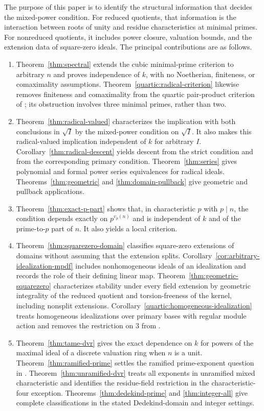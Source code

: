 \documentclass[11pt,a4paper]{amsart}
\theoremstyle{definition}
\theoremstyle{remark}
\numberwithin{equation}{section}
\begin{document}
The purpose of this paper is to identify the structural information that
decides the mixed-power condition. For reduced quotients, that information
is the interaction between roots of unity and residue characteristics at
minimal primes. For nonreduced quotients, it includes power closure,
valuation bounds, and the extension data of square-zero ideals. The
principal contributions are as follows.
\begin{enumerate}
\item Theorem~\ref{thm:spectral} extends the cubic minimal-prime criterion
to arbitrary $n$ and proves independence of $k$, with no Noetherian,
finiteness, or comaximality assumptions.
Theorem~\ref{quartic:radical-criterion} likewise removes finiteness
and comaximality from the quartic pair-product criterion of
\cite[Theorem~2.8]{TAHA}; its obstruction involves three minimal
primes, rather than two.
\item Theorem~\ref{thm:radical-valued} characterizes the implication with
both conclusions in $\sqrt I$ by the mixed-power condition on $\sqrt I$.
It also makes this radical-valued implication independent of $k$ for
arbitrary $I$. Corollary~\ref{thm:radical-descent} yields descent from
the strict condition and from the corresponding primary condition.
Theorem~\ref{thm:series} gives polynomial and formal power series
equivalences for radical ideals. Theorems~\ref{thm:geometric} and
\ref{thm:domain-pullback} give geometric and pullback applications.
\item Theorem~\ref{thm:exact-p-part} shows that, in characteristic $p$ with
$p\mid n$, the condition depends exactly on $p^{v_p(n)}$ and is independent
of $k$ and of the prime-to-$p$ part of $n$. It also yields a local criterion.
\item Theorem~\ref{thm:squarezero-domain} classifies square-zero extensions
of domains without assuming that the extension splits.
Corollary~\ref{cor:arbitrary-idealization-mpdf} includes nonhomogeneous
ideals of an idealization and records the role of their defining linear map.
Theorem~\ref{thm:geometric-squarezero} characterizes stability under
every field extension by geometric integrality of the reduced quotient
and torsion-freeness of the kernel, including nonsplit extensions.
Corollary~\ref{quartic:homogeneous-idealization} treats homogeneous
idealizations over primary bases with regular module action and
removes the restriction on $3$ from \cite[Theorem~5.5]{TAHA}.
\item Theorem~\ref{thm:tame-dvr} gives the exact dependence on $k$ for powers
of the maximal ideal of a discrete valuation ring when $n$ is a unit.
Theorem~\ref{thm:ramified-prime} settles the ramified prime-exponent question
in \cite[Remark~5]{Yes}. Theorem~\ref{thm:unramified-dvr} treats all exponents in unramified
mixed characteristic and identifies the residue-field restriction in the
characteristic-four exception. Theorems~\ref{thm:dedekind-prime} and
\ref{thm:integer-all} give complete classifications in the stated
Dedekind-domain and integer settings.
\end{enumerate}
\end{document}
